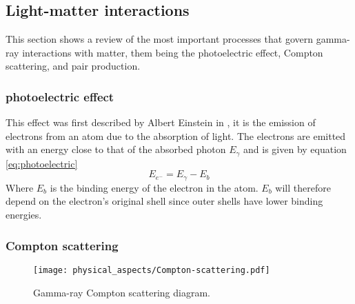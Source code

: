 \subsection{Light-matter interactions}

This section shows a review of the most important processes that govern gamma-ray interactions with matter, them being the photoelectric effect, Compton scattering, and pair production.

\subsubsection{photoelectric effect}

This effect was first described by Albert Einstein in \cite{einstein1905heuristic}, it is the emission of electrons from an atom due to the absorption of light. The electrons are emitted with an energy close to that of the absorbed photon $E_\gamma$ and is given by equation \eqref{eq:photoelectric}
\begin{equation}
  E_{e^-} = E_\gamma - E_b \label{eq:photoelectric}
\end{equation}
Where $E_b$ is the binding energy of the electron in the atom. $E_b$ will therefore depend on the electron's original shell since outer shells have lower binding energies.

\subsubsection{Compton scattering}\label{sec:compt_scattering}

\begin{figure}[H]
  \centering
  \texttt{[image: physical\_aspects/Compton-scattering.pdf]}
  \caption{\label{fig:Compton_scattering_diagram}Gamma-ray Compton scattering diagram.}
\end{figure}

